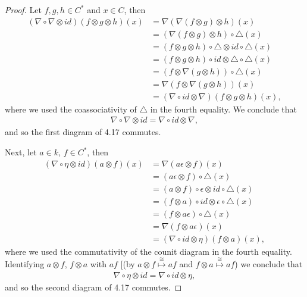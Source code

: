 \documentclass[8pt]{extarticle}
\newcommand{\<}{\langle}
\renewcommand{\>}{\rangle}
\theoremstyle{definition}
\begin{document}
\begin{proof}
  Let $f,g,h \in C^*$ and $x \in C$, then 
  \begin{align*}
    (\nabla \circ \nabla \otimes id)(f \otimes g \otimes h)(x)
    &= \nabla(\nabla(f \otimes g) \otimes h)(x)\\
    &= (\nabla(f \otimes g) \otimes h) \circ \triangle(x)\\
    &= (f \otimes g \otimes h) \circ \triangle \otimes id \circ \triangle(x)\\
    &= (f \otimes g \otimes h) \circ id \otimes \triangle \circ \triangle(x)\\
    &= (f \otimes \nabla(g \otimes h))\circ \triangle(x)\\
    &= \nabla(f \otimes \nabla(g \otimes h))(x) \\
    &= (\nabla\circ id \otimes \nabla)(f \otimes g \otimes h)(x),    
  \end{align*}
  where we used the coassociativity of $\triangle$ in the fourth equality. We conclude that
  \begin{align*}
    \nabla \circ \nabla \otimes id = \nabla\circ id \otimes \nabla,
  \end{align*}
  and so the first diagram of 4.17 commutes.

  Next, let $a \in k$, $f \in C^*$, then
  \begin{align*}
    (\nabla \circ \eta \otimes id)(a \otimes f)(x)
    &=
    \nabla(a \epsilon \otimes f)(x) \\
    &=
    (a \epsilon \otimes f) \circ \triangle (x) \\
    &=
    (a \otimes f)\circ \epsilon \otimes id \circ \triangle (x) \\
    &=
    (f \otimes a) \circ id \otimes \epsilon \circ \triangle (x) \\
    &=
    (f \otimes a \epsilon)  \circ \triangle (x) \\
    &=
    \nabla(f \otimes a \epsilon) (x) \\
    &= (\nabla \circ id \otimes \eta)(f \otimes a) (x),
  \end{align*}
  where we used the commutativity of the counit diagram in the fourth equality. Identifying $a \otimes f$, $f \otimes a$  with $af$ [(by $a \otimes f \overset{\cong}{\mapsto} af$ and $f \otimes a \overset{\cong}{\mapsto} af$) we conclude that
  \begin{align*}
    \nabla \circ \eta \otimes id = \nabla \circ id \otimes \eta,
  \end{align*}
  and so the second diagram of 4.17 commutes.
\end{proof}
\end{document}
